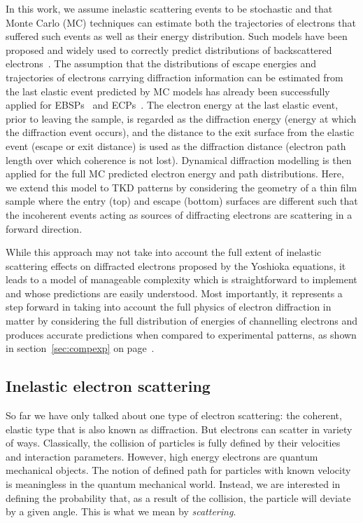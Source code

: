 In this work, we assume inelastic scattering events to be stochastic and that Monte Carlo (MC) techniques can estimate both the trajectories of electrons that suffered such events as well as their energy distribution. Such models have been proposed and widely used to correctly predict distributions of backscattered electrons~\cite{joy1995a}. The assumption that the distributions of escape energies and trajectories of electrons carrying diffraction information can be estimated from the last elastic event predicted by MC models has already been successfully applied for EBSPs~\cite{degraef2013e} and ECPs~\cite{degraef2017k}. The electron energy at the last elastic event, prior to leaving the sample, is regarded as the diffraction energy (energy at which the diffraction event occurs), and the distance to the exit surface from the elastic event (escape or exit distance) is used as the diffraction distance (electron path length over which coherence is not lost). Dynamical diffraction modelling is then applied for the full MC predicted electron energy and path distributions. Here, we extend this model to TKD patterns by considering the geometry of a thin film sample where the entry (top) and escape (bottom) surfaces are different such that the incoherent events acting as sources of diffracting electrons are scattering in a forward direction. 

While this approach may not take into account the full extent of inelastic scattering effects on diffracted electrons proposed by the Yoshioka equations, it leads to a model of manageable complexity which is straightforward to implement and whose predictions are easily understood. Most importantly, it represents a step forward in taking into account the full physics of electron diffraction in matter by considering the full distribution of energies of channelling electrons and produces accurate predictions when compared to experimental patterns, as shown in section~\ref{sec:compexp} on page~\pageref{sec:compexp}.


\subsection{Inelastic electron scattering}
\label{sec:scatter}

So far we have only talked about one type of electron scattering: the coherent, elastic type that is also known as diffraction. But electrons can scatter in variety of ways.  Classically, the collision of particles is fully defined by their velocities and interaction parameters. However, high energy electrons are quantum mechanical objects. The notion of defined path for particles with known velocity is meaningless in the quantum mechanical world. Instead, we are interested in defining the probability that, as a result of the collision, the particle will deviate by a given angle. This is what we mean by \textit{scattering}.


